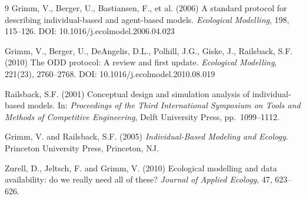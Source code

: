\documentclass[11pt,a4paper]{article}
\begin{document}
\begin{thebibliography}{9}
Grimm, V., Berger, U., Bastiansen, F., et al. (2006)
A standard protocol for describing individual-based and agent-based models.
\emph{Ecological Modelling}, 198, 115--126.
DOI: 10.1016/j.ecolmodel.2006.04.023

Grimm, V., Berger, U., DeAngelis, D.L., Polhill, J.G., Giske, J.,
Railsback, S.F. (2010)
The ODD protocol: A review and first update.
\emph{Ecological Modelling}, 221(23), 2760--2768.
DOI: 10.1016/j.ecolmodel.2010.08.019

Railsback, S.F. (2001)
Conceptual design and simulation analysis of individual-based models.
In: \emph{Proceedings of the Third International Symposium on Tools and
Methods of Competitive Engineering}, Delft University Press, pp.~1099--1112.

Grimm, V. and Railsback, S.F. (2005)
\emph{Individual-Based Modeling and Ecology}. Princeton University Press,
Princeton, NJ.

Zurell, D., Jeltsch, F. and Grimm, V. (2010)
Ecological modelling and data availability: do we really need all of
these? \emph{Journal of Applied Ecology}, 47, 623--626.
\end{thebibliography}
\end{document}
